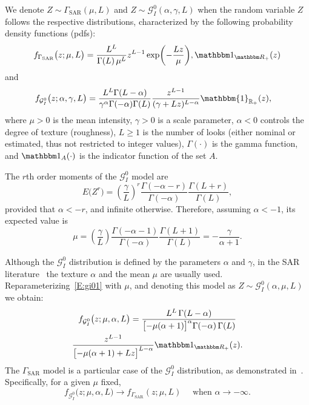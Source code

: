 \documentclass[
  lettersize  journal,
]{IEEEtran}%
\begin{document}
We denote \(Z \sim \Gamma_{\mathrm{SAR}}(\mu, L)\) and
\(Z \sim \mathcal{G}_I^0(\alpha, \gamma, L)\) when the random variable
\(Z\) follows the respective distributions, characterized by the
following probability density functions (pdfs): \begin{equation}
    f_{\Gamma_{\text{SAR}}}\bigl(z;\mu, L\bigr) 
    = \frac{L^L}{\Gamma(L)\,\mu^L} z^{L-1} 
    \exp \biggl(-\frac{Lz}{\mu}\biggr),
    \mathbbm 1_{\mathbbm R_+}(z) \label{E:gamma1}
\end{equation} and \begin{align}
 f_{\mathcal{G}^0_I}\bigl(z;  \alpha,\gamma, L \bigr) &=\frac{L^L\Gamma(L-\alpha)}{\gamma^{\alpha}\Gamma(-\alpha)\Gamma(L)}\frac{z^{L-1}}{(\gamma+Lz)^{L-\alpha}} \mathbbm{1}_{\mathbb{R}_+}(z), \label{E:gi01}
\end{align} where \(\mu > 0\) is the mean intensity, \(\gamma > 0\) is a
scale parameter, \(\alpha < 0\) controls the degree of texture
(roughness), \(L \geq 1\) is the number of looks (either nominal or
estimated, thus not restricted to integer values), \(\Gamma(\cdot)\) is
the gamma function, and \(\mathbbm 1_{A}(\cdot)\) is the indicator
function of the set \(A\).

The \(r\)th order moments of the \(\mathcal{G}_I^0\) model are
\begin{equation}
E\big(Z^r\big)  = \left(\frac{\gamma}{L}\right)^r\frac{\Gamma(-\alpha-r)}{\Gamma(-\alpha)}\frac{\Gamma(L+r)}{\Gamma(L)}, 
    \label{E:rmom}
\end{equation} provided that \(\alpha <-r\), and infinite otherwise.
Therefore, assuming \(\alpha<-1\), its expected value is
\begin{equation}
    \mu=\left(\frac{\gamma}{L}\right)\frac{\Gamma(-\alpha-1)}{\Gamma(-\alpha)}\frac{\Gamma(L+1)}{\Gamma(L)}=-\frac{\gamma}{\alpha+1}.
    \label{E:mean1}
\end{equation}

Although the \(\mathcal{G}_I^0\) distribution is defined by the
parameters \(\alpha\) and \(\gamma\), in the SAR
literature~ the texture
\(\alpha\) and the mean \(\mu\) are usually used.
Reparameterizing~\eqref{E:gi01} with \(\mu\), and denoting this model as
\(Z \sim \mathcal{G}_I^0(\alpha, \mu, L)\) we obtain: \begin{multline}
    f_{\mathcal{G}^0_I}\bigl(z; \mu, \alpha, L \bigr) 
    = \frac{L^L\,\Gamma(L-\alpha)}
    {\bigl[-\mu(\alpha+1)\bigr]^{\alpha} \Gamma(-\alpha)\,\Gamma(L)}\\
    \frac{z^{L-1}}
    {\bigl[-\mu(\alpha+1)+Lz\bigr]^{L-\alpha}}
    \mathbbm 1_{\mathbbm R_+}(z). \label{E:gi02}
\end{multline} The \(\Gamma_{\mathrm{SAR}}\) model is a particular case
of the \(\mathcal{G}^0_I\) distribution, as demonstrated
in~. Specifically, for a given \(\mu\)
fixed, \[
f_{\mathcal{G}^0_I}\big(z; \mu, \alpha, L\big)
\longrightarrow 
f_{\Gamma_{\text{SAR}}}(z;\mu, L) \quad \text{ when } \alpha\to-\infty.
\]
\end{document}
